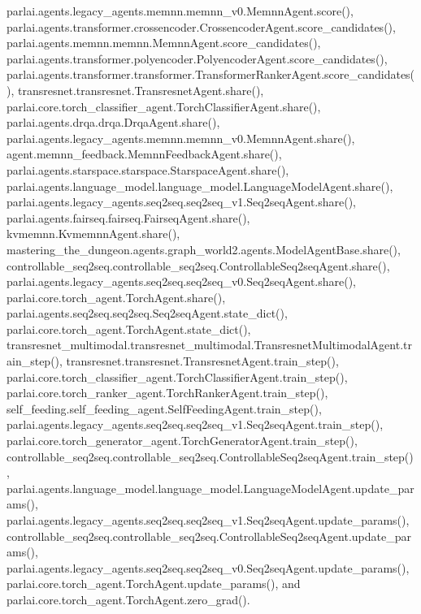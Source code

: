 parlai.\+agents.\+legacy\+\_\+agents.\+memnn.\+memnn\+\_\+v0.\+Memnn\+Agent.\+score(), parlai.\+agents.\+transformer.\+crossencoder.\+Crossencoder\+Agent.\+score\+\_\+candidates(), parlai.\+agents.\+memnn.\+memnn.\+Memnn\+Agent.\+score\+\_\+candidates(), parlai.\+agents.\+transformer.\+polyencoder.\+Polyencoder\+Agent.\+score\+\_\+candidates(), parlai.\+agents.\+transformer.\+transformer.\+Transformer\+Ranker\+Agent.\+score\+\_\+candidates(), transresnet.\+transresnet.\+Transresnet\+Agent.\+share(), parlai.\+core.\+torch\+\_\+classifier\+\_\+agent.\+Torch\+Classifier\+Agent.\+share(), parlai.\+agents.\+drqa.\+drqa.\+Drqa\+Agent.\+share(), parlai.\+agents.\+legacy\+\_\+agents.\+memnn.\+memnn\+\_\+v0.\+Memnn\+Agent.\+share(), agent.\+memnn\+\_\+feedback.\+Memnn\+Feedback\+Agent.\+share(), parlai.\+agents.\+starspace.\+starspace.\+Starspace\+Agent.\+share(), parlai.\+agents.\+language\+\_\+model.\+language\+\_\+model.\+Language\+Model\+Agent.\+share(), parlai.\+agents.\+legacy\+\_\+agents.\+seq2seq.\+seq2seq\+\_\+v1.\+Seq2seq\+Agent.\+share(), parlai.\+agents.\+fairseq.\+fairseq.\+Fairseq\+Agent.\+share(), kvmemnn.\+Kvmemnn\+Agent.\+share(), mastering\+\_\+the\+\_\+dungeon.\+agents.\+graph\+\_\+world2.\+agents.\+Model\+Agent\+Base.\+share(), controllable\+\_\+seq2seq.\+controllable\+\_\+seq2seq.\+Controllable\+Seq2seq\+Agent.\+share(), parlai.\+agents.\+legacy\+\_\+agents.\+seq2seq.\+seq2seq\+\_\+v0.\+Seq2seq\+Agent.\+share(), parlai.\+core.\+torch\+\_\+agent.\+Torch\+Agent.\+share(), parlai.\+agents.\+seq2seq.\+seq2seq.\+Seq2seq\+Agent.\+state\+\_\+dict(), parlai.\+core.\+torch\+\_\+agent.\+Torch\+Agent.\+state\+\_\+dict(), transresnet\+\_\+multimodal.\+transresnet\+\_\+multimodal.\+Transresnet\+Multimodal\+Agent.\+train\+\_\+step(), transresnet.\+transresnet.\+Transresnet\+Agent.\+train\+\_\+step(), parlai.\+core.\+torch\+\_\+classifier\+\_\+agent.\+Torch\+Classifier\+Agent.\+train\+\_\+step(), parlai.\+core.\+torch\+\_\+ranker\+\_\+agent.\+Torch\+Ranker\+Agent.\+train\+\_\+step(), self\+\_\+feeding.\+self\+\_\+feeding\+\_\+agent.\+Self\+Feeding\+Agent.\+train\+\_\+step(), parlai.\+agents.\+legacy\+\_\+agents.\+seq2seq.\+seq2seq\+\_\+v1.\+Seq2seq\+Agent.\+train\+\_\+step(), parlai.\+core.\+torch\+\_\+generator\+\_\+agent.\+Torch\+Generator\+Agent.\+train\+\_\+step(), controllable\+\_\+seq2seq.\+controllable\+\_\+seq2seq.\+Controllable\+Seq2seq\+Agent.\+train\+\_\+step(), parlai.\+agents.\+language\+\_\+model.\+language\+\_\+model.\+Language\+Model\+Agent.\+update\+\_\+params(), parlai.\+agents.\+legacy\+\_\+agents.\+seq2seq.\+seq2seq\+\_\+v1.\+Seq2seq\+Agent.\+update\+\_\+params(), controllable\+\_\+seq2seq.\+controllable\+\_\+seq2seq.\+Controllable\+Seq2seq\+Agent.\+update\+\_\+params(), parlai.\+agents.\+legacy\+\_\+agents.\+seq2seq.\+seq2seq\+\_\+v0.\+Seq2seq\+Agent.\+update\+\_\+params(), parlai.\+core.\+torch\+\_\+agent.\+Torch\+Agent.\+update\+\_\+params(), and parlai.\+core.\+torch\+\_\+agent.\+Torch\+Agent.\+zero\+\_\+grad().

